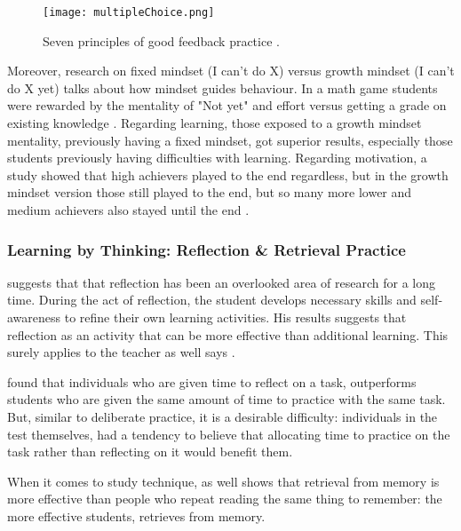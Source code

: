   \begin{figure}[h]
    \centering
    \texttt{[image: multipleChoice.png]}
    \caption{Seven principles of good feedback practice \cite{nicol}.}
    \label{fig:sierra-practice}
\end{figure}

  Moreover, research on fixed mindset (I can't do X) versus growth mindset (I can't do X yet) talks about how mindset guides behaviour. In a math game students were rewarded by the mentality of "Not yet" and effort versus getting a grade on existing knowledge \citep{dweck-youtube}. Regarding learning, those exposed to a growth mindset mentality, previously having a fixed mindset, got superior results, especially those students previously having difficulties with learning. Regarding motivation, a study showed that high achievers played to the end regardless, but in the growth mindset version those still played to the end, but so many more lower and medium achievers also stayed until the end \citep{dweck-youtube}.

  \subsubsection{Learning by Thinking: Reflection \& Retrieval Practice}

  \cite{stefano} suggests that that reflection has been an overlooked area of research for a long time. During the act of reflection, the student develops necessary skills and self-awareness to refine their own learning activities. His results suggests that reflection as an activity that can be more effective than additional learning. This surely applies to the teacher as well says \cite{luckin}.

  \cite{stefano} found that individuals who are given time to reflect on a task, outperforms students who are given the same amount of time to practice with the same task. But, similar to deliberate practice, it is a desirable difficulty: individuals in the test themselves, had a tendency to believe that allocating time to practice on the task rather than reflecting on it would benefit them.


  When it comes to study technique, \cite{bjork} as well shows that retrieval from memory is more effective than people who repeat reading the same thing to remember: the more effective students, retrieves from memory.

